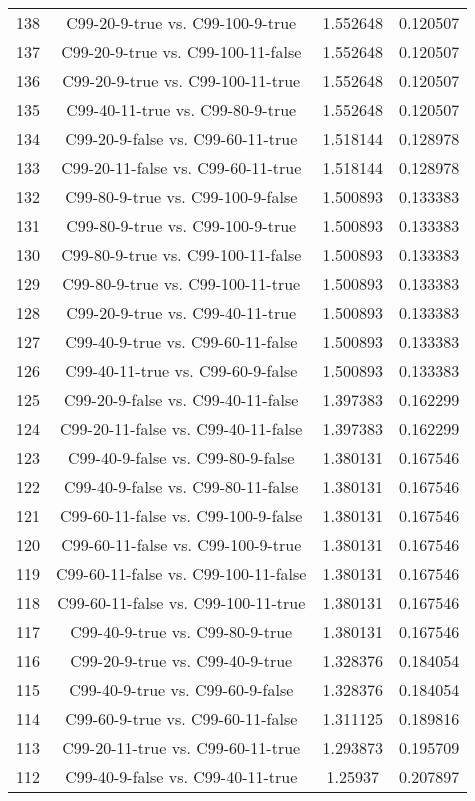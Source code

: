 \documentclass[a4paper,10pt]{article}
\begin{document}
\begin{landscape}
\begin{table}[!htp]
\begin{tabular}{cccc}
138&C99-20-9-true vs. C99-100-9-true&1.552648&0.120507\\
137&C99-20-9-true vs. C99-100-11-false&1.552648&0.120507\\
136&C99-20-9-true vs. C99-100-11-true&1.552648&0.120507\\
135&C99-40-11-true vs. C99-80-9-true&1.552648&0.120507\\
134&C99-20-9-false vs. C99-60-11-true&1.518144&0.128978\\
133&C99-20-11-false vs. C99-60-11-true&1.518144&0.128978\\
132&C99-80-9-true vs. C99-100-9-false&1.500893&0.133383\\
131&C99-80-9-true vs. C99-100-9-true&1.500893&0.133383\\
130&C99-80-9-true vs. C99-100-11-false&1.500893&0.133383\\
129&C99-80-9-true vs. C99-100-11-true&1.500893&0.133383\\
128&C99-20-9-true vs. C99-40-11-true&1.500893&0.133383\\
127&C99-40-9-true vs. C99-60-11-false&1.500893&0.133383\\
126&C99-40-11-true vs. C99-60-9-false&1.500893&0.133383\\
125&C99-20-9-false vs. C99-40-11-false&1.397383&0.162299\\
124&C99-20-11-false vs. C99-40-11-false&1.397383&0.162299\\
123&C99-40-9-false vs. C99-80-9-false&1.380131&0.167546\\
122&C99-40-9-false vs. C99-80-11-false&1.380131&0.167546\\
121&C99-60-11-false vs. C99-100-9-false&1.380131&0.167546\\
120&C99-60-11-false vs. C99-100-9-true&1.380131&0.167546\\
119&C99-60-11-false vs. C99-100-11-false&1.380131&0.167546\\
118&C99-60-11-false vs. C99-100-11-true&1.380131&0.167546\\
117&C99-40-9-true vs. C99-80-9-true&1.380131&0.167546\\
116&C99-20-9-true vs. C99-40-9-true&1.328376&0.184054\\
115&C99-40-9-true vs. C99-60-9-false&1.328376&0.184054\\
114&C99-60-9-true vs. C99-60-11-false&1.311125&0.189816\\
113&C99-20-11-true vs. C99-60-11-true&1.293873&0.195709\\
112&C99-40-9-false vs. C99-40-11-true&1.25937&0.207897\\

\end{tabular}
\end{table}
\end{landscape}
\end{document}
